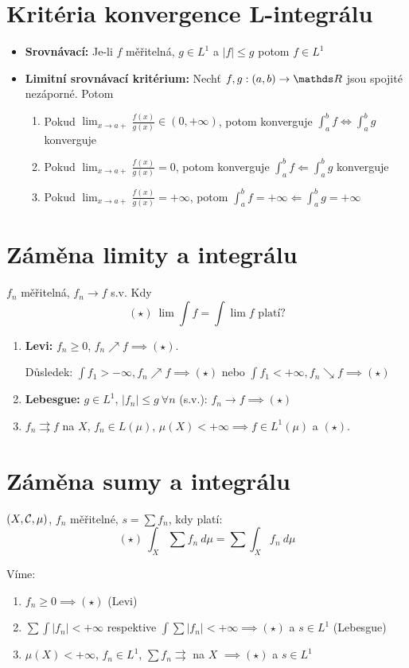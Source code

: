 \documentclass[12pt,a4paper]{article}
\begin{document}
\section{Kritéria konvergence L-integrálu}
\begin{itemize}
	\item {\bf Srovnávací:} Je-li $f$ měřitelná, $g \in L^1$ a $|f| \leq g$ potom $f \in L^1$
	\item {\bf Limitní srovnávací kritérium:} Nechť $f,g : (a,b) \to \R$ jsou spojité nezáporné. Potom
		\begin{enumerate}
			\item Pokud $\lim_{x \to a+} \frac{f(x)}{g(x)} \in (0, +\infty)$, potom konverguje $\int_a^b f \iff \int_a^b g$ konverguje
			\item Pokud $\lim_{x \to a+} \frac{f(x)}{g(x)} = 0$, potom konverguje $\int_a^b f \Leftarrow \int_a^b g$ konverguje
			\item Pokud $\lim_{x \to a+} \frac{f(x)}{g(x)} = +\infty$, potom $\int_a^b f = +\infty \Leftarrow \int_a^b g = +\infty$
		\end{enumerate}
\end{itemize}

\section{Záměna limity a integrálu}
	$f_n$ měřitelná, $f_n \to f$ s.v. Kdy $$(\star)~\lim \int f = \int \lim f \text{ platí?}$$
\begin{enumerate}
	\item {\bf Levi:} $f_n \geq 0$, $f_n \nearrow f \implies (\star)$.

		  Důsledek: $\int f_1 > -\infty, f_n \nearrow f \implies (\star)$ nebo $\int f_1 < +\infty, f_n \searrow f \implies (\star)$
	\item {\bf Lebesgue:} $g \in L^1$, $|f_n| \leq g~\forall n$ (s.v.): $f_n \to f \implies (\star)$
	\item $f_n \rightrightarrows f$ na $X$, $f_n \in L(\mu)$, $\mu(X) < +\infty \implies f \in L^1(\mu)$ a $(\star)$.
\end{enumerate}

\section{Záměna sumy a integrálu}
$(X, \mathcal{ C }, \mu)$, $f_n$ měřitelné, $s = \sum f_n$, kdy platí:
	$$(\star)~\int_X \sum f_n~d\mu = \sum \int_X f_n~d\mu$$

Víme:
\begin{enumerate}
	\item $f_n \geq 0 \implies (\star)$ (Levi)
	\item $\sum \int |f_n| < +\infty$ respektive $\int \sum |f_n| < +\infty \implies (\star)$ a $s \in L^1$ (Lebesgue)
	\item $\mu(X) < +\infty$, $f_n \in L^1$, $\sum f_n \rightrightarrows$ na $X$ $\implies (\star)$ a $s \in L^1$
\end{enumerate}
\end{document}
